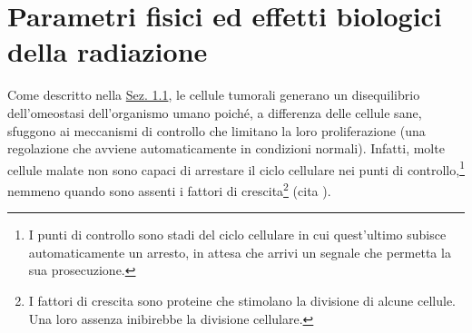 \documentclass[12pt,a4paper,twoside]{report}
\begin{document}
	\section{Parametri fisici ed effetti biologici della radiazione}
	Come descritto nella \hyperref[sec:1.1]{Sez. 1.1}, le cellule tumorali generano un disequilibrio dell'omeostasi dell'organismo umano poiché, a differenza delle cellule sane, sfuggono ai meccanismi di controllo che limitano la loro proliferazione (una regolazione che avviene automaticamente in condizioni normali). Infatti, molte cellule malate non sono capaci di arrestare il ciclo cellulare nei punti di controllo,\footnote{I punti di controllo sono stadi del ciclo cellulare in cui quest'ultimo subisce automaticamente un arresto, in attesa che arrivi un segnale che permetta la sua prosecuzione.} nemmeno quando sono assenti i fattori di crescita\footnote{I fattori di crescita sono proteine che stimolano la divisione di alcune cellule. Una loro assenza inibirebbe la divisione cellulare.} (cita
	).
	
\end{document}
